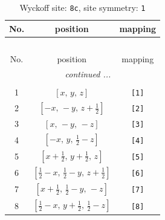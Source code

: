 \documentclass[fleqn,8pt]{jsarticle}
\begin{document}
\renewcommand{\arraystretch}{1.2}
\begin{longtable}{ccc}
\caption{Wyckoff site: {\tt 8c}, site symmetry: {\tt 1}}
 \\
 \hline \hline
No. & position & mapping \\ \hline \endfirsthead

\multicolumn{2}{l}{\tablename\ \thetable{}} \\
 \hline \hline
No. & position & mapping \\ \hline \endhead

 \hline \hline
\multicolumn{2}{r}{\footnotesize\it continued ...} \\ \endfoot

 \hline \hline
\multicolumn{2}{r}{} \\ \endlastfoot

1 & $\left[ x,\, y,\, z \right]$ & {\tt [1]} \\ \hline
2 & $\left[ - x,\, - y,\, z + \frac{1}{2} \right]$ & {\tt [2]} \\ \hline
3 & $\left[ x,\, - y,\, - z \right]$ & {\tt [3]} \\ \hline
4 & $\left[ - x,\, y,\, \frac{1}{2} - z \right]$ & {\tt [4]} \\ \hline
5 & $\left[ x + \frac{1}{2},\, y + \frac{1}{2},\, z \right]$ & {\tt [5]} \\ \hline
6 & $\left[ \frac{1}{2} - x,\, \frac{1}{2} - y,\, z + \frac{1}{2} \right]$ & {\tt [6]} \\ \hline
7 & $\left[ x + \frac{1}{2},\, \frac{1}{2} - y,\, - z \right]$ & {\tt [7]} \\ \hline
8 & $\left[ \frac{1}{2} - x,\, y + \frac{1}{2},\, \frac{1}{2} - z \right]$ & {\tt [8]} \\
\end{longtable}
\end{document}
